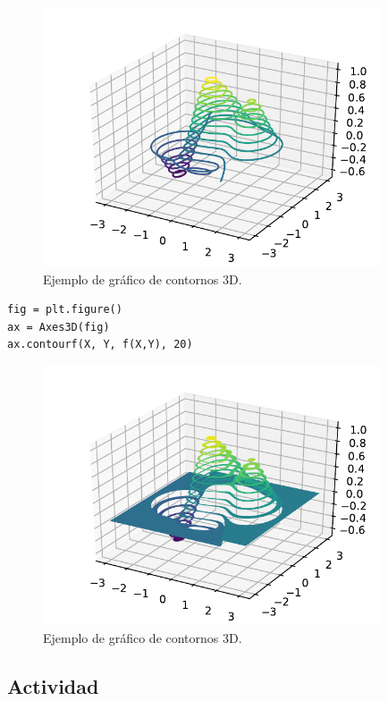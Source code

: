 \begin{figure}[H]
	\centering
	\includegraphics[width=10cm]{img/herramientas/grafico_contorno3D}
	\caption{Ejemplo de gráfico de contornos 3D.}
	\label{fig:grafico_contorno3D}
\end{figure}

\begin{listing}[H]
\begin{verbatim}
fig = plt.figure()
ax = Axes3D(fig)
ax.contourf(X, Y, f(X,Y), 20)
\end{verbatim}
\end{listing}

\begin{figure}[H]
	\centering
	\includegraphics[width=10cm]{img/herramientas/grafico_contorno_lleno_3D}
	\caption{Ejemplo de gráfico de contornos 3D.}
	\label{fig:grafico_contorno_lleno_3D}
\end{figure}

\subsection{Actividad}

